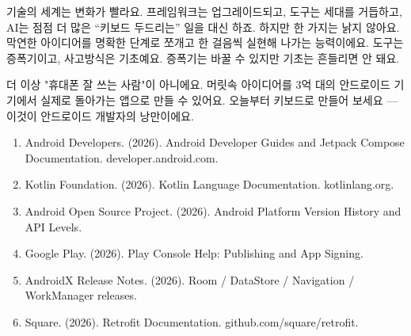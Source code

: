 기술의 세계는 변화가 빨라요. 프레임워크는 업그레이드되고, 도구는 세대를 거듭하고, AI는 점점 더 많은 “키보드 두드리는” 일을 대신 하죠. 하지만 한 가지는 낡지 않아요. 막연한 아이디어를 명확한 단계로 쪼개고 한 걸음씩 실현해 나가는 능력이에요. 도구는 증폭기이고, 사고방식은 기초예요. 증폭기는 바꿀 수 있지만 기초는 흔들리면 안 돼요.

더 이상 "휴대폰 잘 쓰는 사람"이 아니에요. 머릿속 아이디어를 3억 대의 안드로이드 기기에서 실제로 돌아가는 앱으로 만들 수 있어요. 오늘부터 키보드로 만들어 보세요 — 이것이 안드로이드 개발자의 낭만이에요.


\begin{enumerate}
  \item Android Developers. (2026). Android Developer Guides and Jetpack Compose Documentation. developer.android.com.
  \item Kotlin Foundation. (2026). Kotlin Language Documentation. kotlinlang.org.
  \item Android Open Source Project. (2026). Android Platform Version History and API Levels.
  \item Google Play. (2026). Play Console Help: Publishing and App Signing.
  \item AndroidX Release Notes. (2026). Room / DataStore / Navigation / WorkManager releases.
  \item Square. (2026). Retrofit Documentation. github.com/square/retrofit.
\end{enumerate}
